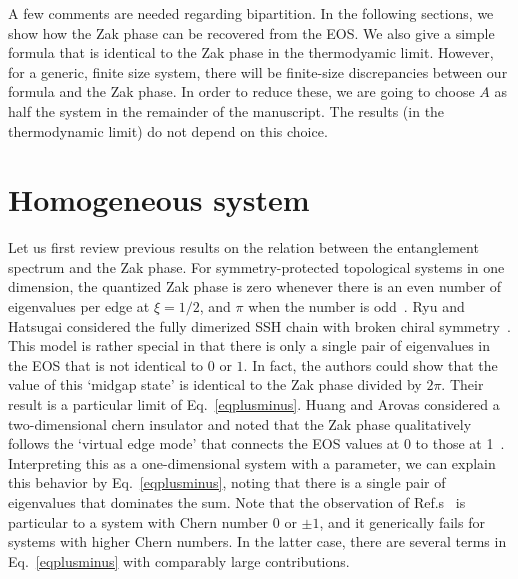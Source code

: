\documentclass[twocolumn,amsmath,longbibliography,amssymb,superscriptaddress]{revtex4-1}
\begin{document}
A few comments are needed regarding  bipartition. 
In the following sections, we show how the Zak phase can be recovered from the EOS.
We also give a simple formula that is identical to the Zak phase in the thermodyamic limit.  
However, for a generic, finite size system, there will be finite-size discrepancies between our formula and the Zak phase.
In order to reduce these, we are going to choose $A$ as half the system in the remainder of the manuscript.
The results (in the thermodynamic limit) do not depend on this choice. 
\section{Homogeneous system}

Let us first review previous results on the relation between the entanglement spectrum and the Zak phase. 
For symmetry-protected topological systems in one dimension, the quantized Zak phase is zero whenever there is an even number  of eigenvalues per edge at $\xi = 1/2$, and $\pi$ when the number is odd~\cite{Peschel2008}. 
Ryu and Hatsugai considered the fully dimerized SSH chain with broken chiral symmetry~\cite{Ryu2006}.  
This model is rather special in that there is only a single pair of eigenvalues in the EOS that is not identical to $0$ or $1$. 
In fact, the authors could show that the value of this `midgap state' is identical to the Zak phase divided by $2\pi$. 
Their result is a particular limit of Eq.~\eqref{eqplusminus}. 
%
Huang and Arovas considered a two-dimensional chern insulator and noted that the Zak phase qualitatively follows the `virtual edge mode' that connects the EOS values at 0 to those at 1~\cite{Huang2012,Huang2012-2}. 
Interpreting this as a one-dimensional system with a parameter, we can explain this behavior by Eq.~\eqref{eqplusminus}, noting that there is a single pair of eigenvalues that dominates the sum. 
Note that the observation of Ref.s~\cite{Huang2012,Huang2012-2} is particular to a system with Chern number 0 or $\pm 1$, and it generically fails for systems with higher Chern numbers.
In the latter case, there are several terms in Eq.~\eqref{eqplusminus} with comparably large contributions. 
\end{document}
